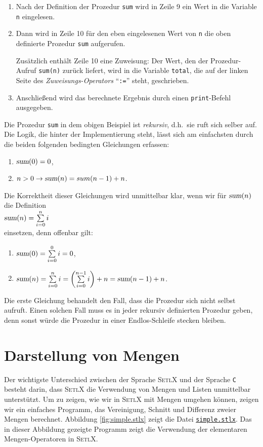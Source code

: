 \begin{enumerate}
\item Nach der Definition der Prozedur \texttt{sum}  wird in Zeile 9 ein Wert 
      in die Variable \texttt{n} eingelesen.
\item Dann wird in Zeile 10 für den eben eingelesenen Wert von \texttt{n} die oben definierte Prozedur
      \texttt{sum} aufgerufen.  

      Zusätzlich enthält Zeile 10 eine Zuweisung: Der Wert, den der Prozedur-Aufruf
      \texttt{sum(n)} zurück liefert, wird in die Variable \texttt{total}, die auf der
      linken Seite des \emph{Zuweisungs-Operators} ``\texttt{:=}'' steht, geschrieben.
\item Anschließend wird das berechnete Ergebnis durch einen \texttt{print}-Befehl ausgegeben.
\end{enumerate}
Die Prozedur \texttt{sum} in dem obigen Beispiel ist \emph{rekursiv}, d.h.~sie ruft sich
selber auf.  Die Logik, die hinter der Implementierung steht, lässt sich am einfachsten
durch die beiden folgenden bedingten Gleichungen erfassen:
\begin{enumerate}
\item $\textsl{sum}(0) = 0$,
\item $n > 0 \rightarrow \textsl{sum}(n) = sum(n-1) + n$.
\end{enumerate}
Die Korrektheit dieser Gleichungen wird unmittelbar klar, wenn wir für $\textsl{sum}(n)$
die Definition
\\[0.2cm]
\hspace*{1.3cm}
$\textsl{sum}(n)= \sum\limits_{i=0}^n i$ 
\\[0.2cm]
einsetzen, denn offenbar gilt:
\begin{enumerate}
\item $\textsl{sum}(0)= \sum\limits_{i=0}^0 i = 0$,
\item $\textsl{sum}(n)= \sum\limits_{i=0}^n i = \left(\sum\limits_{i=0}^{n-1} i\right) + n = \textsl{sum}(n-1) + n$. 

\end{enumerate}
Die erste Gleichung behandelt den Fall, dass die Prozedur sich nicht selbst
aufruft.  Einen solchen Fall muss es in jeder rekursiv definierten Prozedur geben, denn
sonst würde die Prozedur in einer Endlos-Schleife stecken bleiben. 

\section{Darstellung von Mengen}
Der wichtigste Unterschied zwischen der Sprache \textsc{SetlX} und der Sprache \texttt{C}
besteht darin, dass \textsc{SetlX} die Verwendung von Mengen und Listen unmittelbar unterstützt.
Um zu zeigen, wie wir in \textsc{SetlX} mit Mengen umgehen können, zeigen wir ein
 einfaches Programm, das Vereinigung, Schnitt und
Differenz zweier Mengen berechnet.   Abbildung \ref{fig:simple.stlx} zeigt die Datei
\href{https://github.com/karlstroetmann/Logik/blob/master/SetlX/simple.stlx}{\texttt{simple.stlx}}.  
Das in dieser Abbildung gezeigte Programm zeigt die Verwendung der
elementaren Mengen-Operatoren in \textsc{SetlX}.

